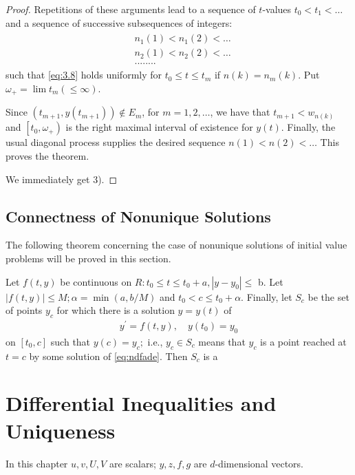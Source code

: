 \documentclass{article}
\begin{document}
\begin{proof}
Repetitions of these arguments lead to a sequence of $t$-values $t_{0}<t_{1}<\ldots$ and a sequence of successive subsequences of integers:
\begin{align*}
\begin{aligned}
&n_{1}(1)<n_{1}(2)<\ldots \\
&n_{2}(1)<n_{2}(2)<\ldots \\
& . . . . . . . .
\end{aligned}
\end{align*}
such that \cref{eq:3.8} holds uniformly for $t_{0} \le t \le t_{m}$ if $n(k)=n_{m}(k)$. Put $\omega_{+}=\lim t_{m}(\le \infty) .$ 

Since $\left(t_{m+1}, y\left(t_{m+1}\right)\right) \notin E_{m}$, for $m=1,2, \ldots$, we have that $t_{m+1}<w_{n(k)}$ and $\left[t_{0}, \omega_{+}\right)$ is the right maximal interval of existence for $y(t)$. Finally, the usual diagonal process supplies the desired sequence $n(1)<n(2)<\ldots$ This proves the theorem.

 We immediately get 3).
\end{proof}

\subsection{Connectness of Nonunique Solutions}
The following theorem concerning the case of nonunique solutions of initial value problems will be proved in this section.
\begin{thma}
Let $f(t, y)$ be continuous on $R: t_{0} \le t \le t_{0}+a,\left|y-y_{0}\right| \le$
b. Let $|f(t, y)| \le M ; \alpha=\min (a, b / M)$ and $t_{0}<c \le t_{0}+\alpha$. Finally, let $S_c$ be the set of points $y_{c}$ for which there is a solution $y=y(t)$ of
\begin{align}
    y^{\prime}=f(t, y), \quad y\left(t_{0}\right)=y_{0}\label{eq:ndfade}
\end{align}
on $\left[t_{0}, c\right]$ such that $y(c)=y_{c} ;$ i.e., $y_{c} \in S_{c}$ means that $y_{c}$ is a point reached at $t=c$ by some solution of \cref{eq:ndfade}. Then $S_{c}$ is a 
\end{thma}


\section{Differential Inequalities and Uniqueness}
In this chapter $u, v, U, V$ are scalars; $y, z, f, g$ are $d$-dimensional vectors.
\end{document}
